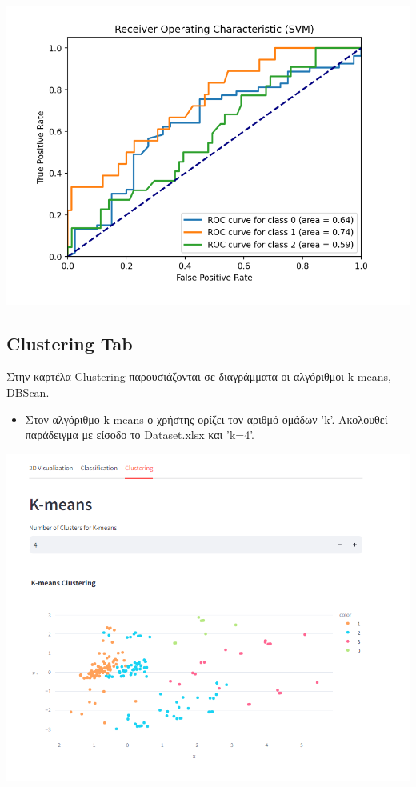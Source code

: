 \documentclass{article}
\begin{document}
\includegraphics[width=1.0\linewidth]{tab1_svm3.png}

\newpage
\subsection{Clustering Tab}

 Στην καρτέλα Clustering παρουσιάζονται σε διαγράμματα οι αλγόριθμοι k-means, DBScan.
\begin{itemize}
  \item {}Στον αλγόριθμο k-means ο χρήστης ορίζει τον αριθμό ομάδων 'k'. Ακολουθεί παράδειγμα με είσοδο το Dataset.xlsx και 'k=4'.
\end{itemize}

\includegraphics[width=1.0\linewidth]{tab2_kmeans.png}
\end{document}

